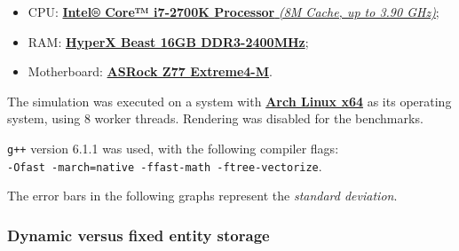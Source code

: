 \documentclass[oneside, 12pt, a4paper, openany]{book}
\begin{document}
\begin{itemize}
\item
  CPU:
  \href{http://ark.intel.com/products/61275/Intel-Core-i7-2700K-Processor-8M-Cache-up-to-3_90-GHz}{\textbf{Intel®
  Core™ i7-2700K Processor} \emph{(8M Cache, up to 3.90 GHz)}};
\item
  RAM: \href{http://www.hyperxgaming.com/us/memory/beast}{\textbf{HyperX
  Beast 16GB DDR3-2400MHz}};
\item
  Motherboard:
  \href{http://www.asrock.com/mb/intel/z77\%20extreme4-m/}{\textbf{ASRock
  Z77 Extreme4-M}}.
\end{itemize}

The simulation was executed on a system with
\href{https://www.archlinux.org/}{\textbf{Arch Linux x64}} as its
operating system, using \(8\) worker threads. Rendering was disabled for
the benchmarks.

\texttt{g++}
version 6.1.1 was used, with the following compiler flags:\\
\texttt{-Ofast -march=native -ffast-math -ftree-vectorize}.

The error bars in the following graphs represent the \emph{standard
deviation}.

\subsubsection{Dynamic versus fixed entity
storage}\label{dynamic-versus-fixed-entity-storage}
\end{document}
